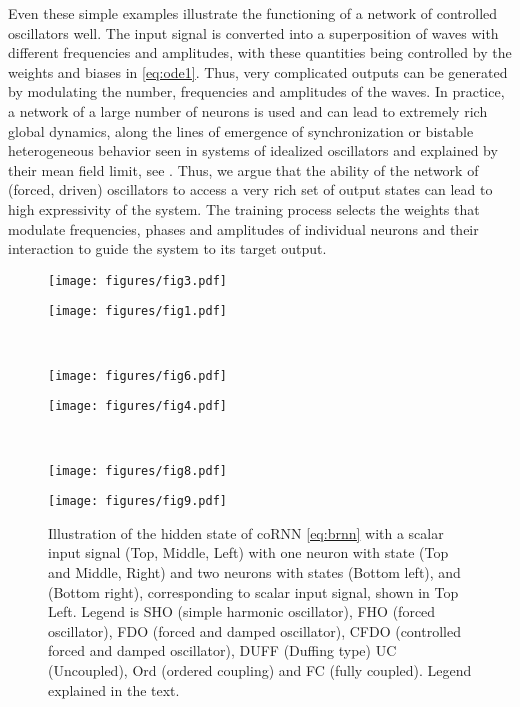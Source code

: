 \documentclass{article} \usepackage{iclr2021_conference,times}
\begin{document}
Even these simple examples illustrate the functioning of a network of controlled oscillators well. The input signal is converted into a superposition of waves with different frequencies and amplitudes, with these quantities being controlled by the weights and biases in \eqref{eq:ode1}. Thus, very complicated outputs can be generated by modulating the number, frequencies and amplitudes of the waves. In practice, a network of a large number of neurons is used and can lead to extremely rich global dynamics, along the lines of emergence of synchronization or bistable heterogeneous behavior seen in systems of idealized oscillators and explained by their mean field limit, see \cite{KUR,WIN,stgz1}. Thus, we argue that the ability of the network of (forced, driven) oscillators to access a very rich set of output states can lead to high expressivity of the system. The training process selects the weights that modulate frequencies, phases and amplitudes of individual neurons and their interaction to guide the system to its target output. 
\begin{figure}[ht!]
\begin{minipage}{.5\textwidth}
\texttt{[image: figures/fig3.pdf]}
\end{minipage}\begin{minipage}{.5\textwidth}
\texttt{[image: figures/fig1.pdf]}
\end{minipage} \\
\begin{minipage}{.5\textwidth}
\texttt{[image: figures/fig6.pdf]}
\end{minipage}\begin{minipage}{.5\textwidth}
\texttt{[image: figures/fig4.pdf]}
\end{minipage}
 \\
\begin{minipage}{.5\textwidth}
\texttt{[image: figures/fig8.pdf]}
\end{minipage}
\begin{minipage}{.5\textwidth}
\texttt{[image: figures/fig9.pdf]}
\end{minipage} 
\caption{Illustration of the hidden state  of coRNN \eqref{eq:brnn} with a scalar input signal  (Top, Middle, Left) with one neuron with state  (Top and Middle, Right) and two neurons with states  (Bottom left), and  (Bottom right), corresponding to scalar input signal, shown in Top Left. Legend is SHO (simple harmonic oscillator), FHO (forced oscillator), FDO (forced and damped oscillator), CFDO (controlled forced and damped oscillator), DUFF (Duffing type) UC (Uncoupled), Ord (ordered coupling) and FC (fully coupled). Legend explained in the text.}
\label{fig:1}
\end{figure}
\end{document}
